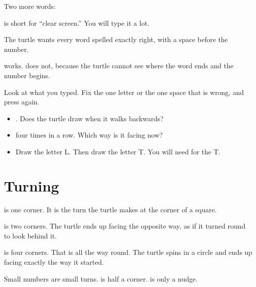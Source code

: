 \documentclass[12pt,oneside,paper=5.5in:8.5in,DIV=11,chapterprefix=false,headings=big]{scrbook}
\begin{document}
Two more words:

\begin{commandlist}
\end{commandlist}

 is short for ``clear screen.''
You will type it a lot.

\begin{heads}
The turtle wants every word spelled exactly right,
with a space before the number.

 works.
 does not,
because the turtle cannot see where the word ends
and the number begins.

Look at what you typed.
Fix the one letter or the one space that is wrong,
and press  again.
\end{heads}

\begin{trythis}[Try]
\begin{itemize}
\item {}. Does the turtle draw when it walks backwards?
\item {} four times in a row. Which way is it facing now?
\item Draw the letter L. Then draw the letter T.
  You will need  for the T.
\end{itemize}
\end{trythis}

\chaptericon{\faRedo}
\chapter{Turning}
\label{ch:turn}


 is one corner.
It is the turn the turtle makes
at the corner of a square.

 is two corners.
The turtle ends up facing the opposite way,
as if it turned round to look behind it.

 is four corners.
That is all the way round.
The turtle spins in a circle
and ends up facing exactly the way it started.

Small numbers are small turns.
 is half a corner.
 is only a nudge.
\end{document}

